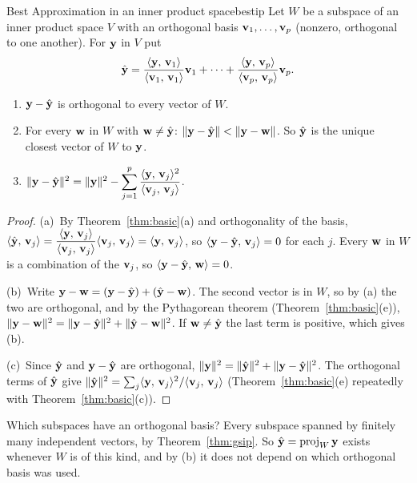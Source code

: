 \documentclass[11pt]{article}
\begin{document}
\begin{thm}{Best Approximation in an inner product space}{bestip}
Let $W$ be a subspace of an inner product space $V$ with an orthogonal basis $\mathbf{v}_1,\dots,\mathbf{v}_p$ (nonzero, orthogonal to one another). For $\mathbf{y}$ in $V$ put
\[
\hat{\mathbf{y}}=\frac{\langle \mathbf{y},\,\mathbf{v}_1\rangle}{\langle \mathbf{v}_1,\,\mathbf{v}_1\rangle}\mathbf{v}_1+\cdots+\frac{\langle \mathbf{y},\,\mathbf{v}_p\rangle}{\langle \mathbf{v}_p,\,\mathbf{v}_p\rangle}\mathbf{v}_p .
\]
\begin{enumerate}[label=(\alph*),itemsep=1pt]
  \item $\mathbf{y}-\hat{\mathbf{y}}$ is orthogonal to every vector of $W$.
  \item For every $\mathbf{w}$ in $W$ with $\mathbf{w}\neq\hat{\mathbf{y}}$: $\lVert\mathbf{y}-\hat{\mathbf{y}}\rVert<\lVert\mathbf{y}-\mathbf{w}\rVert$. So $\hat{\mathbf{y}}$ is the unique closest vector of $W$ to $\mathbf{y}$.
  \item $\lVert\mathbf{y}-\hat{\mathbf{y}}\rVert^2=\lVert\mathbf{y}\rVert^2-\displaystyle\sum_{j=1}^{p}\frac{\langle \mathbf{y},\,\mathbf{v}_j\rangle^2}{\langle \mathbf{v}_j,\,\mathbf{v}_j\rangle}$.
\end{enumerate}
\end{thm}

\begin{proof}
(a)~By Theorem~\ref{thm:basic}(a) and orthogonality of the basis, $\langle \hat{\mathbf{y}},\,\mathbf{v}_j\rangle=\dfrac{\langle \mathbf{y},\,\mathbf{v}_j\rangle}{\langle \mathbf{v}_j,\,\mathbf{v}_j\rangle}\langle \mathbf{v}_j,\,\mathbf{v}_j\rangle=\langle \mathbf{y},\,\mathbf{v}_j\rangle$, so $\langle \mathbf{y}-\hat{\mathbf{y}},\,\mathbf{v}_j\rangle=0$ for each $j$. Every $\mathbf{w}$ in $W$ is a combination of the $\mathbf{v}_j$, so $\langle \mathbf{y}-\hat{\mathbf{y}},\,\mathbf{w}\rangle=0$.

(b)~Write $\mathbf{y}-\mathbf{w}=(\mathbf{y}-\hat{\mathbf{y}})+(\hat{\mathbf{y}}-\mathbf{w})$. The second vector is in $W$, so by (a) the two are orthogonal, and by the Pythagorean theorem (Theorem~\ref{thm:basic}(e)), $\lVert\mathbf{y}-\mathbf{w}\rVert^2=\lVert\mathbf{y}-\hat{\mathbf{y}}\rVert^2+\lVert\hat{\mathbf{y}}-\mathbf{w}\rVert^2$. If $\mathbf{w}\neq\hat{\mathbf{y}}$ the last term is positive, which gives (b).

(c)~Since $\hat{\mathbf{y}}$ and $\mathbf{y}-\hat{\mathbf{y}}$ are orthogonal, $\lVert\mathbf{y}\rVert^2=\lVert\hat{\mathbf{y}}\rVert^2+\lVert\mathbf{y}-\hat{\mathbf{y}}\rVert^2$. The orthogonal terms of $\hat{\mathbf{y}}$ give $\lVert\hat{\mathbf{y}}\rVert^2=\sum_j\langle \mathbf{y},\,\mathbf{v}_j\rangle^2/\langle \mathbf{v}_j,\,\mathbf{v}_j\rangle$ (Theorem~\ref{thm:basic}(e) repeatedly with Theorem~\ref{thm:basic}(c)).
\end{proof}

Which subspaces have an orthogonal basis? Every subspace spanned by finitely many independent vectors, by Theorem~\ref{thm:gsip}. So $\hat{\mathbf{y}}=\operatorname{proj}_W\mathbf{y}$ exists whenever $W$ is of this kind, and by (b) it does not depend on which orthogonal basis was used.
\end{document}
